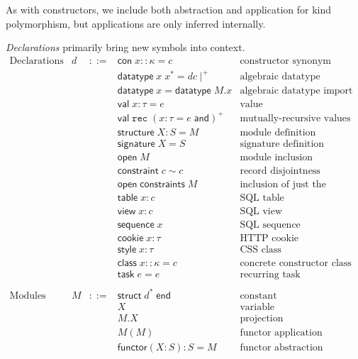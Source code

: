 \documentclass{article}
\newcommand{\cd}[1]{\texttt{#1}}
\newcommand{\mt}[1]{\mathsf{#1}}
\begin{document}
As with constructors, we include both abstraction and application for kind polymorphism, but applications are only inferred internally.

\emph{Declarations} primarily bring new symbols into context.
$$\begin{array}{rrcll}
  \textrm{Declarations} & d &::=& \mt{con} \; x :: \kappa = c & \textrm{constructor synonym} \\
  &&& \mt{datatype} \; x \; x^* = dc\mid^+ & \textrm{algebraic datatype definition} \\
  &&& \mt{datatype} \; x = \mt{datatype} \; M.x & \textrm{algebraic datatype import} \\
  &&& \mt{val} \; x : \tau = e & \textrm{value} \\
  &&& \mt{val} \; \cd{rec} \; (x : \tau = e \; \mt{and})^+ & \textrm{mutually-recursive values} \\
  &&& \mt{structure} \; X : S = M & \textrm{module definition} \\
  &&& \mt{signature} \; X = S & \textrm{signature definition} \\
  &&& \mt{open} \; M & \textrm{module inclusion} \\
  &&& \mt{constraint} \; c \sim c & \textrm{record disjointness constraint} \\
  &&& \mt{open} \; \mt{constraints} \; M & \textrm{inclusion of just the constraints from a module} \\
  &&& \mt{table} \; x : c & \textrm{SQL table} \\
  &&& \mt{view} \; x : c & \textrm{SQL view} \\
  &&& \mt{sequence} \; x & \textrm{SQL sequence} \\
  &&& \mt{cookie} \; x : \tau & \textrm{HTTP cookie} \\
  &&& \mt{style} \; x : \tau & \textrm{CSS class} \\
  &&& \mt{class} \; x :: \kappa = c & \textrm{concrete constructor class} \\
  &&& \mt{task} \; e = e & \textrm{recurring task} \\
  \\
  \textrm{Modules} & M &::=& \mt{struct} \; d^* \; \mt{end} & \textrm{constant} \\
  &&& X & \textrm{variable} \\
  &&& M.X & \textrm{projection} \\
  &&& M(M) & \textrm{functor application} \\
  &&& \mt{functor}(X : S) : S = M & \textrm{functor abstraction} \\
\end{array}$$
\end{document}
